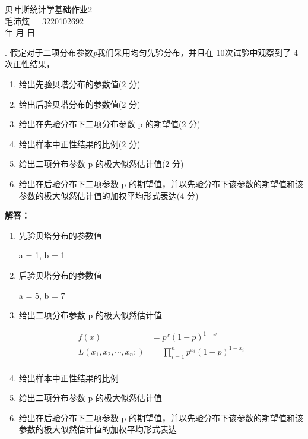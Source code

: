 \documentclass[11pt]{article}
\renewcommand{\today}{\number\year 年 \number\month 月 \number\day 日}
\begin{document}
\begin{titlepage}
    \centering
    \vspace*{4cm} %
    \Huge
    贝叶斯统计学基础作业2 \\
    \vspace{1cm}
    \Large
    毛沛炫\ \ \ 3220102692 \\
    \vspace{12.3cm}
    \Large
    \today
    \vfill
\end{titlepage}


. 假定对于二项分布参数\textit{p}我们采用均匀先验分布，并且在 10次试验中观察到了 4 次正性结果，
\begin{enumerate}[itemsep=2pt,topsep=0pt,parsep=0pt,label=(\alph*)]
\item  给出先验贝塔分布的参数值(2 分)

\item  给出后验贝塔分布的参数值(2 分)
    
\item  给出在先验分布下二项分布参数 p 的期望值(2 分)
    
\item  给出样本中正性结果的比例(2 分)
    
\item  给出二项分布参数 p 的极大似然估计值(2 分)
    
\item  给出在后验分布下二项参数 p 的期望值，并以先验分布下该参数的期望值和该参数的极大似然估计值的加权平均形式表达(4 分)
\end{enumerate}


\noindent \textbf{解答：}
\begin{enumerate}[itemsep=2pt,topsep=0pt,parsep=0pt,label=(\alph*)]
    \item 先验贝塔分布的参数值
    
    a  = 1, b = 1
    \item 后验贝塔分布的参数值

    a = 5, b = 7

    \item 给出二项分布参数 p 的极大似然估计值
    
    \begin{align}
        f(x) & = p^x(1-p)^{1-x} \\
        L(x_1, x_2, \cdots, x_n; ) & = \prod_{i=1}^{n} p^{x_i}(1-p)^{1-x_i} \\
    \end{align}

    \item 给出样本中正性结果的比例
    
    \item  给出二项分布参数 p 的极大似然估计值
    
    \item  给出在后验分布下二项参数 p 的期望值，并以先验分布下该参数的期望值和该参数的极大似然估计值的加权平均形式表达

\end{enumerate}
\end{document}
